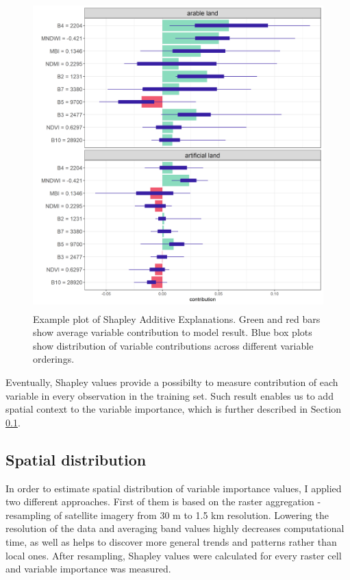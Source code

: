 \documentclass{amuthesis}
\begin{document}
\begin{figure}[H]

{\centering \includegraphics[width=4.54167in,height=4.6875in]{./figures/shapley_values.png}

}

\caption{\label{fig-rycina8}Example plot of Shapley Additive
Explanations. Green and red bars show average variable contribution to
model result. Blue box plots show distribution of variable contributions
across different variable orderings.}

\end{figure}

Eventually, Shapley values provide a possibilty to measure contribution
of each variable in every observation in the training set. Such result
enables us to add spatial context to the variable importance, which is
further described in Section \ref{sec-importance-distribution}.

\hypertarget{sec-importance-distribution}{%
\subsection{Spatial distribution}\label{sec-importance-distribution}}

In order to estimate spatial distribution of variable importance values,
I applied two different approaches. First of them is based on the raster
aggregation - resampling of satellite imagery from 30 m to 1.5 km
resolution. Lowering the resolution of the data and averaging band
values highly decreases computational time, as well as helps to discover
more general trends and patterns rather than local ones. After
resampling, Shapley values were calculated for every raster cell and
variable importance was measured.
\end{document}
